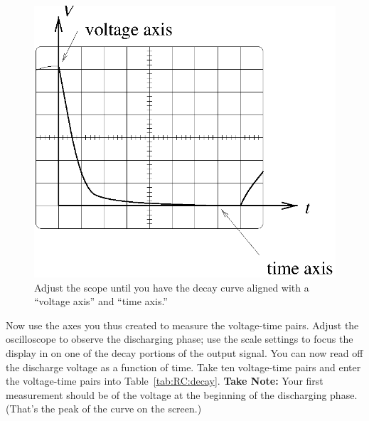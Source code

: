 \begin{figure}[htb]
\epsfxsize=8cm
\centering 
\includegraphics[scale=0.7]{5_rccircuits/scope.eps}
\caption{Adjust the scope until you have the decay curve aligned with a 
``voltage axis'' and ``time axis.''}
\label{fig:scope}
\end{figure}

\noindent Now use the axes you thus created to measure the voltage-time pairs.
Adjust the oscilloscope to observe the discharging phase; 
use the scale 
settings to focus the display in on one of the decay portions of the output
signal. You can now read off the discharge voltage as a function of time. Take 
ten voltage-time pairs and enter the voltage-time pairs into 
Table~\ref{tab:RC:decay}.
{\bf Take Note:} Your first measurement should be of the 
voltage at the beginning of
the discharging phase. (That's the peak of the curve on the screen.) 

